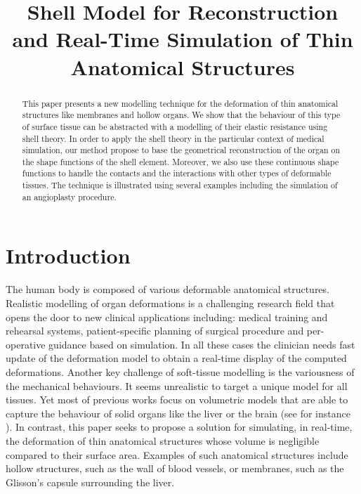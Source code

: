 \documentclass{llncs}
\begin{document}
\title{Shell Model for Reconstruction and Real-Time Simulation of Thin Anatomical Structures}

\maketitle

\begin{abstract}
This paper presents a new modelling technique for the deformation of thin anatomical structures like membranes and hollow organs. We show that the behaviour of this type of surface tissue can be abstracted with a modelling of their elastic resistance using shell theory. In order to apply the shell theory in the particular context of medical simulation, our method propose to base the geometrical reconstruction of the organ on the shape functions of the shell element. Moreover, we also use these continuous shape functions to handle the contacts and the interactions with other types of deformable tissues. The technique is illustrated using several examples including the simulation of an angioplasty procedure.
\end{abstract}

\section{Introduction}

The human body is composed of various deformable anatomical structures. Realistic modelling of organ deformations is a challenging research field that opens the door to new clinical applications including: medical training and rehearsal systems, patient-specific planning of surgical procedure and per-operative guidance based on simulation. In all these cases the clinician needs fast update of the deformation model to obtain a real-time display of the computed deformations. 
Another key challenge of soft-tissue modelling is the variousness of the mechanical behaviours. It seems unrealistic to target a unique model for all tissues.
Yet most of previous works focus on volumetric models that are able to capture the behaviour of solid organs like the liver or the brain (see for instance \cite{Miller07,Delingette08}). In contrast, this paper seeks to propose a solution for simulating, in real-time, the deformation of thin anatomical structures whose volume is negligible compared to their surface area. Examples of such anatomical structures include hollow structures, such as the wall of blood vessels, or membranes, such as the Glisson's capsule surrounding the liver.
\end{document}
